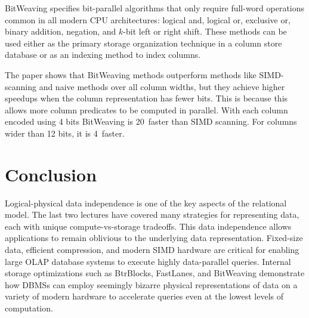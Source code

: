 \documentclass[11pt]{article}
\begin{document}
BitWeaving specifies bit-parallel algorithms that only require full-word operations common in all modern CPU architectures: logical and, logical or, exclusive or, binary addition, negation, and $k$-bit left or right shift. These methods can be used either as the primary storage organization technique in a column store database or as an indexing method to index columns.

The paper shows that BitWeaving methods outperform methods like SIMD-scanning and naive methods over all column widths, but they achieve higher speedups when the column representation has fewer bits. This is because this allows more column predicates to be computed in parallel. With each column encoded using 4 bits BitWeaving is 20\texttimes\ faster than SIMD scanning. For columns wider than 12 bits, it is 4\texttimes\ faster.

\section{Conclusion}
Logical-physical data independence is one of the key aspects of the relational model. The last two lectures have covered many strategies for representing data, each with unique compute-vs-storage tradeoffs. This data independence allows applications to remain oblivious to the underlying data representation. Fixed-size data, efficient compression, and modern SIMD hardware are critical for enabling large OLAP database systems to execute highly data-parallel queries. Internal storage optimizations such as BtrBlocks, FastLanes, and BitWeaving demonstrate how DBMSs can employ seemingly bizarre physical representations of data on a variety of modern hardware to accelerate queries even at the lowest levels of computation.
\newpage


\end{document}
